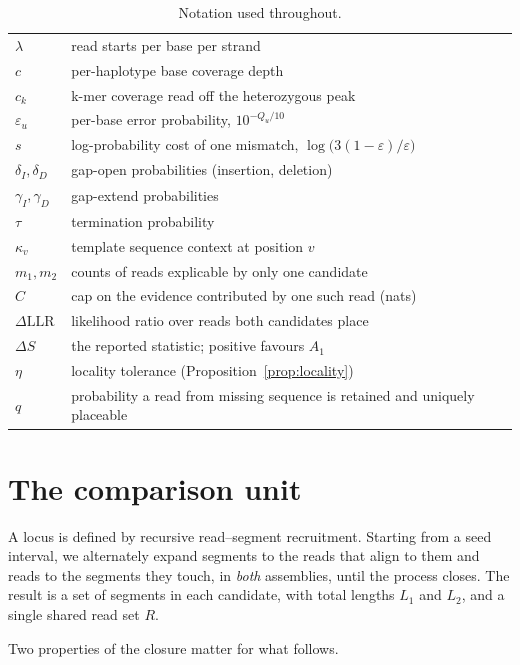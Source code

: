 \documentclass[11pt]{article}
\begin{document}
\begin{table}[t]
\begin{tabular}{ll}
$\lambda$       & read starts per base per strand \\
$c$             & per-haplotype base coverage depth \\
$c_k$           & k-mer coverage read off the heterozygous peak \\
$\varepsilon_u$ & per-base error probability, $10^{-Q_u/10}$ \\
$s$             & log-probability cost of one mismatch, $\log\!\big(3(1-\varepsilon)/\varepsilon\big)$ \\
$\delta_I,\delta_D$ & gap-open probabilities (insertion, deletion) \\
$\gamma_I,\gamma_D$ & gap-extend probabilities \\
$\tau$          & termination probability \\
$\kappa_v$      & template sequence context at position $v$ \\
$m_1, m_2$      & counts of reads explicable by only one candidate \\
$C$             & cap on the evidence contributed by one such read (nats) \\
$\Delta\mathrm{LLR}$ & likelihood ratio over reads both candidates place \\
$\Delta S$      & the reported statistic; positive favours $A_1$ \\
$\eta$          & locality tolerance (Proposition~\ref{prop:locality}) \\
$q$             & probability a read from missing sequence is retained and uniquely placeable \\
\bottomrule
\end{tabular}
\caption{Notation used throughout.}
\label{tab:notation}
\end{table}

\section{The comparison unit}
\label{sec:unit}

A locus is defined by recursive read--segment recruitment.  Starting from a seed
interval, we alternately expand segments to the reads that align to them and
reads to the segments they touch, in \emph{both} assemblies, until the process
closes.  The result is a set of segments in each candidate, with total lengths
$L_1$ and $L_2$, and a single shared read set $R$.

Two properties of the closure matter for what follows.
\end{document}
